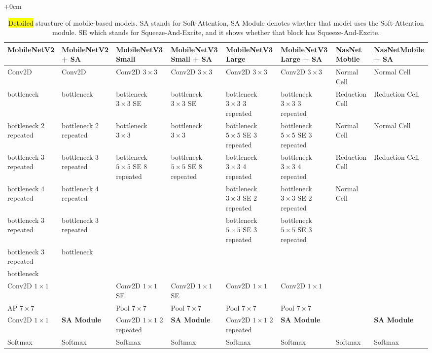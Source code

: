 \documentclass[sensors,article,accept,pdftex,moreauthors]{Definitions/mdpi}
\begin{document}
\begin{adjustwidth}{+\extralength}{0cm}
	\begin{table}[H]
		\caption{\hl{Detailed} structure of mobile-based models. SA stands for Soft-Attention, SA Module denotes whether that model uses the Soft-Attention module. SE which stands for Squeeze-And-Excite, and it shows whether that block has Squeeze-And-Excite. \label{appendix-table:detailed mobile model structure}}%
\begin{tabularx}{\textwidth}{p{3cm}  p{3cm}  p{4.2cm}  p{3cm}  p{3cm}  p{3cm}  p{2.3cm}  p{2.3cm}}
	\toprule
	\textbf{MobileNetV2} & \textbf{MobileNetV2 + SA} & \textbf{MobileNetV3 Small} & \textbf{MobileNetV3 Small + SA} & \textbf{MobileNetV3 Large} & \textbf{MobileNetV3 Large + SA} & \textbf{NasNet Mobile} & \textbf{NasNetMobile + SA}\\
	\midrule
	Conv2D & Conv2D& Conv2D $3 \times 3$& Conv2D $3 \times 3$& Conv2D $3 \times 3$& Conv2D $3 \times 3$ & Normal Cell & Normal Cell\\	\midrule		
	bottleneck & bottleneck & bottleneck $3 \times 3$ SE& bottleneck $3 \times 3$ SE& bottleneck $3 \times 3$ 3 repeated& bottleneck $3 \times 3$ 3 repeated& Reduction Cell& Reduction Cell\\ \midrule		
	bottleneck 2 repeated& bottleneck 2 repeated& bottleneck $3 \times 3$& bottleneck $3 \times 3$& bottleneck $5 \times 5$ SE 3 repeated& bottleneck $5 \times 5$ SE 3 repeated & Normal Cell & Normal Cell\\ \midrule	
	bottleneck 3 repeated& bottleneck 3 repeated& bottleneck $5 \times 5$ SE 8 repeated& bottleneck $5 \times 5$ SE 8 repeated& bottleneck $3 \times 3$ 4 repeated& bottleneck $3 \times 3$ 4 repeated& Reduction Cell & Reduction Cell\\ \midrule	
	bottleneck 4 repeated& bottleneck 4 repeated& & & bottleneck $3 \times 3$ SE 2 repeated& bottleneck $3 \times 3$ SE 2 repeated & Normal Cell\\ \midrule	
	bottleneck 3 repeated& bottleneck 3 repeated& & & bottleneck $5 \times 5$ SE 3 repeated& bottleneck $5 \times 5$ SE 3 repeated& \\ \midrule	
	bottleneck 3 repeated& bottleneck & & & & & \\ \midrule	
	bottleneck & & & & & & \\ \midrule
	Conv2D $1 \times 1$ & & Conv2D $1 \times 1$ SE & Conv2D $1 \times 1$ SE& Conv2D $1 \times 1$& Conv2D $1 \times 1$ & & \\ \midrule
	AP $7 \times 7$ & & Pool $7 \times 7$& Pool $7 \times 7$& Pool $7 \times 7$& Pool $7 \times 7$& &\\ \midrule
	Conv2D $1 \times 1$ & \textbf{SA Module}& Conv2D $1 \times 1$ 2 repeated& \textbf{SA Module}& Conv2D $1 \times 1$ 2 repeated& \textbf{SA Module}& &\textbf{SA Module}\\ \midrule
	Softmax & Softmax& Softmax& Softmax& Softmax& Softmax& Softmax & Softmax\\ 
	\bottomrule
\end{tabularx}
	\end{table}

\end{adjustwidth}	\finishlandscape
\end{document}

